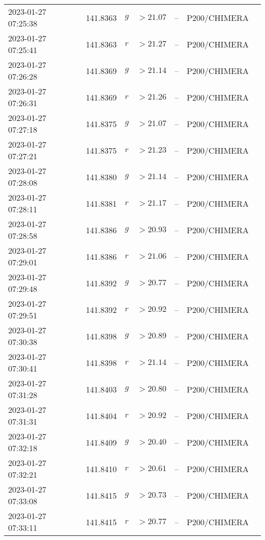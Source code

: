 \documentclass{nature_plusfigure}
\begin{document}
\begin{supplement}
\begin{center}
\begin{longtable}{lllllll}
2023-01-27 07:25:38 & 141.8363 & $g$ & $>21.07$ & -- & P200/CHIMERA &  \\ 
2023-01-27 07:25:41 & 141.8363 & $r$ & $>21.27$ & -- & P200/CHIMERA &  \\ 
2023-01-27 07:26:28 & 141.8369 & $g$ & $>21.14$ & -- & P200/CHIMERA &  \\ 
2023-01-27 07:26:31 & 141.8369 & $r$ & $>21.26$ & -- & P200/CHIMERA &  \\ 
2023-01-27 07:27:18 & 141.8375 & $g$ & $>21.07$ & -- & P200/CHIMERA &  \\ 
2023-01-27 07:27:21 & 141.8375 & $r$ & $>21.23$ & -- & P200/CHIMERA &  \\ 
2023-01-27 07:28:08 & 141.8380 & $g$ & $>21.14$ & -- & P200/CHIMERA &  \\ 
2023-01-27 07:28:11 & 141.8381 & $r$ & $>21.17$ & -- & P200/CHIMERA &  \\ 
2023-01-27 07:28:58 & 141.8386 & $g$ & $>20.93$ & -- & P200/CHIMERA &  \\ 
2023-01-27 07:29:01 & 141.8386 & $r$ & $>21.06$ & -- & P200/CHIMERA &  \\ 
2023-01-27 07:29:48 & 141.8392 & $g$ & $>20.77$ & -- & P200/CHIMERA &  \\ 
2023-01-27 07:29:51 & 141.8392 & $r$ & $>20.92$ & -- & P200/CHIMERA &  \\ 
2023-01-27 07:30:38 & 141.8398 & $g$ & $>20.89$ & -- & P200/CHIMERA &  \\ 
2023-01-27 07:30:41 & 141.8398 & $r$ & $>21.14$ & -- & P200/CHIMERA &  \\ 
2023-01-27 07:31:28 & 141.8403 & $g$ & $>20.80$ & -- & P200/CHIMERA &  \\ 
2023-01-27 07:31:31 & 141.8404 & $r$ & $>20.92$ & -- & P200/CHIMERA &  \\ 
2023-01-27 07:32:18 & 141.8409 & $g$ & $>20.40$ & -- & P200/CHIMERA &  \\ 
2023-01-27 07:32:21 & 141.8410 & $r$ & $>20.61$ & -- & P200/CHIMERA &  \\ 
2023-01-27 07:33:08 & 141.8415 & $g$ & $>20.73$ & -- & P200/CHIMERA &  \\ 
2023-01-27 07:33:11 & 141.8415 & $r$ & $>20.77$ & -- & P200/CHIMERA &  \\ 
\hline 
\end{longtable} 
\end{center} 

\clearpage


\end{supplement}
\end{document}
